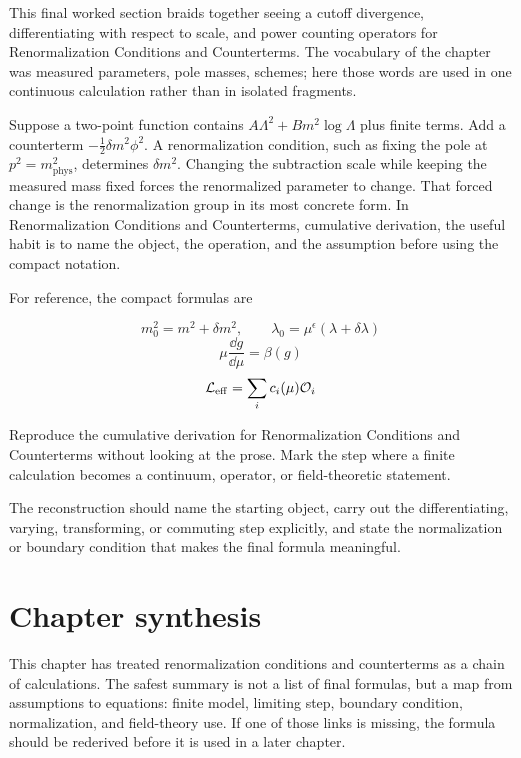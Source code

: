 This final worked section braids together seeing a cutoff divergence, differentiating with respect to scale, and power counting operators for Renormalization Conditions and Counterterms.  The vocabulary of the chapter was measured parameters, pole masses, schemes; here those words are used in one continuous calculation rather than in isolated fragments.

Suppose a two-point function contains \(A\Lambda^2+B m^2\log\Lambda\) plus finite terms.  Add a counterterm \(-\frac12\delta m^2\phi^2\).  A renormalization condition, such as fixing the pole at \(p^2=m_{\mathrm{phys}}^2\), determines \(\delta m^2\).  Changing the subtraction scale while keeping the measured mass fixed forces the renormalized parameter to change.  That forced change is the renormalization group in its most concrete form.  In Renormalization Conditions and Counterterms, cumulative derivation, the useful habit is to name the object, the operation, and the assumption before using the compact notation.

For reference, the compact formulas are

\[
  m_0^2=m^2+\delta m^2,\qquad \lambda_0=\mu^\epsilon(\lambda+\delta\lambda)
\]
\[
  \mu\frac{\dd g}{\dd\mu}=\beta(g)
\]
\[
  \mathcal L_{\mathrm{eff}}=\sum_i c_i(\mu)\mathcal O_i
\]

\begin{exercise}
Reproduce the cumulative derivation for Renormalization Conditions and Counterterms without looking at the prose.  Mark the step where a finite calculation becomes a continuum, operator, or field-theoretic statement.
\begin{answer}
The reconstruction should name the starting object, carry out the differentiating, varying, transforming, or commuting step explicitly, and state the normalization or boundary condition that makes the final formula meaningful.
\end{answer}
\end{exercise}



\section{Chapter synthesis}

This chapter has treated renormalization conditions and counterterms as a chain of calculations.  The safest summary is not a list of final formulas, but a map from assumptions to equations: finite model, limiting step, boundary condition, normalization, and field-theory use.  If one of those links is missing, the formula should be rederived before it is used in a later chapter.

